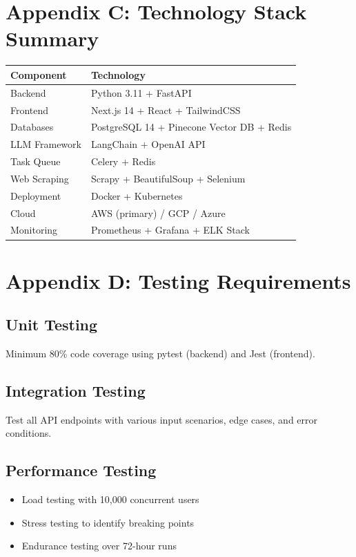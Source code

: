 \documentclass{report}
\begin{document}
\section{Appendix C: Technology Stack Summary}

\begin{table}[h]
\centering
\begin{tabular}{|l|l|}
\hline
\textbf{Component} & \textbf{Technology} \\
\hline
Backend & Python 3.11 + FastAPI \\
Frontend & Next.js 14 + React + TailwindCSS \\
Databases & PostgreSQL 14 + Pinecone Vector DB + Redis \\
LLM Framework & LangChain + OpenAI API \\
Task Queue & Celery + Redis \\
Web Scraping & Scrapy + BeautifulSoup + Selenium \\
Deployment & Docker + Kubernetes \\
Cloud & AWS (primary) / GCP / Azure \\
Monitoring & Prometheus + Grafana + ELK Stack \\
\hline
\end{tabular}
\end{table}

\section{Appendix D: Testing Requirements}

\subsection{Unit Testing}
Minimum 80\% code coverage using pytest (backend) and Jest (frontend).

\subsection{Integration Testing}
Test all API endpoints with various input scenarios, edge cases, and error conditions.

\subsection{Performance Testing}
\begin{itemize}
    \item Load testing with 10,000 concurrent users
    \item Stress testing to identify breaking points
    \item Endurance testing over 72-hour runs
\end{itemize}
\end{document}
